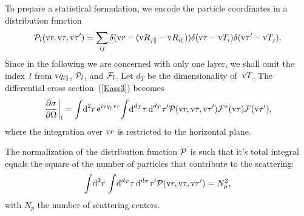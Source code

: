 To prepare a statistical formulation,
we encode the particle coordinates in a distribution function
%
%
%
\begin{equation}\label{EPDdeltas}
  \mathcal{P}_{l}(\text{v}{r},\text{v}\tau,\text{v}\tau')
  = \sum_{ij} \delta(\text{v}{r}-(\text{v}{R}_{j\parallel}-\text{v}{R}_{i\parallel}))
  \delta(\text{v}\tau-\text{v}{T}_i)\delta(\text{v}\tau'-\text{v}{T}_j).
\end{equation}
Since in the following we are concerned with only one layer,
we shall omit the index~$l$ from $\text{v}{q}_{l\parallel}$, $\mathcal{P}_l$, and $\mathcal{F}_l$.
Let $d_T$ be the dimensionality of~$\text{v}{T}$.
The differential cross section~(\ref{Eass3}) becomes
\begin{equation}\label{Epdm1}
  \left.\frac{\partial\sigma}{\partial\Omega}\right|_l
  =
  \int\!\text{d}^2r\,   \text{e}^{i\text{v}{q}_{\parallel}\text{v}{r}}\!
  \int\! \text{d}^{d_T}\tau\, \text{d}^{d_T}\tau'
    \mathcal{P}(\text{v}{r},\text{v}\tau,\text{v}\tau')
    \mathcal{F}^*(\text{v}\tau) \mathcal{F}(\text{v}\tau'),
\end{equation}
where the integration over $\text{v}{r}$ is restricted to the horizontal plane.

The normalization of the distribution function $\mathcal{P}$ is such that it's total
integral equals the square of the number of particles that contribute to the scattering:
\begin{equation}
  \int\!\text{d}^2r\, \int\! \text{d}^{d_T}\tau\, \text{d}^{d_T}\tau' \mathcal{P}(\text{v}{r},\text{v}\tau,\text{v}\tau')
  = N_p^2,
\end{equation}
with $N_p$ the number of scattering centers.
 


